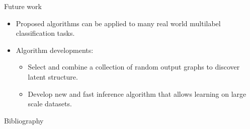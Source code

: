 \documentclass[first=purple,second=dgreen,logo=redexc]{aaltoslides}
\begin{document}
{\begin{frame}{Future work}
	\begin{itemize}
		\item Proposed algorithms can be applied to many real world multilabel classification tasks.
		\item Algorithm developments:
		\begin{itemize}
			\footnotesize
			\item Select and combine a collection of random output graphs to discover latent structure.
			\item Develop new and fast inference algorithm that allows learning on large scale datasets.
		\end{itemize}
	\end{itemize}
\end{frame}

\begin{frame}[allowframebreaks]{Bibliography}
%

 
\end{frame}

}
\end{document}
